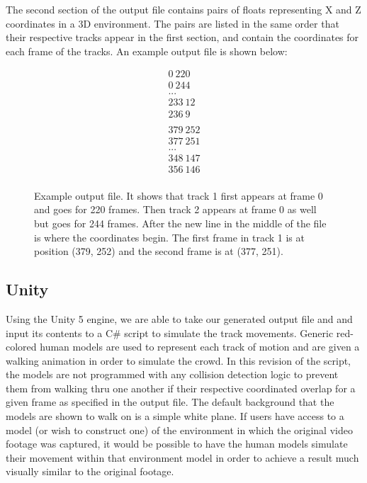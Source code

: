\documentclass[12pt, twocolumn, conference]{IEEEtran}
\begin{document}
The second section of the output file contains pairs of floats representing X and Z coordinates in a 3D environment. The pairs are listed in the same order that their respective tracks appear in the first section, and contain the coordinates for each frame of the tracks. An example output file is shown below:

\begin{figure}
\begin{gather*}
0\ 220 \\
0\ 244 \\
...  \\
233\ 12 \\
236\ 9   \\
 \\
379\ 252 \\
377\ 251 \\
...  \\
348\ 147 \\
356\ 146 \\
\end{gather*}
\caption{Example output file. It shows that track 1 first appears at frame 0 and goes for 220 frames. Then track 2 appears at frame 0 as well but goes for 244 frames. After the new line in the middle of the file is where the coordinates begin. The first frame in track 1 is at position (379, 252) and the second frame is at (377, 251).}
\end{figure}

\subsection{Unity}

Using the Unity 5 engine, we are able to take our generated output file and and input its contents to a C\# script to simulate the track movements. Generic red-colored human models are used to represent each track of motion and are given a walking animation in order to simulate the crowd. In this revision of the script, the models are not programmed with any collision detection  logic to prevent them from walking thru one another if their respective coordinated overlap for a given frame as specified in the output file. The default background that the models are shown to walk on is a simple white plane. If users have access to a model (or wish to construct one) of the environment in which the original video footage was captured, it would be possible to have the human models simulate their movement within that environment model in order to achieve a result much visually similar to the original footage.
\end{document}
